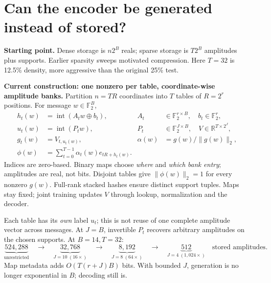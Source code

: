 \documentclass[10pt,a4paper]{article}
\newcommand{\R}{\mathbb R}
\newcommand{\F}{\mathbb F}
\newcommand{\norm}[1]{\lVert #1\rVert_2}
\begin{document}
\newpage
\section{Can the encoder be generated instead of stored?}
\textbf{Starting point.} Dense storage is $n2^B$ reals; sparse storage is $T2^B$ amplitudes plus supports.
Earlier sparsity sweeps motivated compression. Here $T=32$ is 12.5\% density, more aggressive than the original 25\% test.

\textbf{Current construction: one nonzero per table, coordinate-wise amplitude banks.}
Partition $n=TR$ coordinates into $T$ tables of $R=2^r$ positions. For message $w\in\F_2^B$,
\begin{align*}
 h_t(w)&=\operatorname{int}(A_tw\oplus b_t), & A_t&\in\F_2^{r\times B},\quad b_t\in\F_2^r,\\
 u_t(w)&=\operatorname{int}(P_tw), & P_t&\in\F_2^{J\times B},\quad V\in\R^{T\times2^J},\\
 g_t(w)&=V_{t,u_t(w)}, & \alpha(w)&=g(w)/\norm{g(w)},\\[-2pt]
 \phi(w)&=\sum_{t=0}^{T-1}\alpha_t(w)e_{tR+h_t(w)}. &&
\end{align*}
Indices are zero-based. Binary maps choose \emph{where} and \emph{which bank entry}; amplitudes are real, not bits.
Disjoint tables give $\norm{\phi(w)}=1$ for every nonzero $g(w)$. Full-rank stacked hashes ensure distinct support tuples.
Maps stay fixed; joint training updates $V$ through lookup, normalization and the decoder.

Each table has its \emph{own} label $u_t$; this is not reuse of one complete amplitude vector across messages.
At $J=B$, invertible $P_t$ recovers arbitrary amplitudes on the chosen supports. At $B=14,T=32$:
\[
 \underbrace{524{,}288}_{\text{unrestricted}}\quad\longrightarrow\quad
 \underbrace{32{,}768}_{J=10\;(16\times)}\quad\longrightarrow\quad
 \underbrace{8{,}192}_{J=8\;(64\times)}\quad\longrightarrow\quad
 \underbrace{512}_{J=4\;(1{,}024\times)}\quad\text{stored amplitudes.}
\]
Map metadata adds $O(T(r+J)B)$ bits. With bounded $J$, generation is no longer exponential in $B$; decoding still is.
\end{document}

